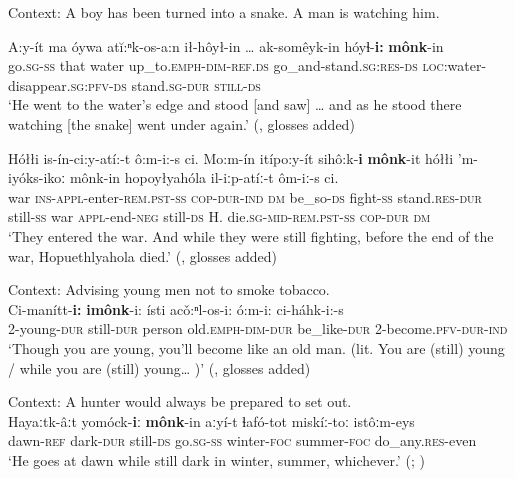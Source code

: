 \begin{exe}
	\ex \label{exAppendixCreekWhile1}
	Context: A boy has been turned into a snake. A man is watching him.
	
\gll A:y-ít ma óywa atĭ:ⁿk-os-a:n ił-hôył-in … ak-somêyk-in hóyɬ-\textbf{i:} \textbf{mônk}-in\\
go.\textsc{sg}-\textsc{ss} that water up\_to.\textsc{emph}-\textsc{dim}-\textsc{ref}.\textsc{ds} go\_and-stand.\textsc{sg}:\textsc{res}-\textsc{ds} {} \textsc{loc}:water-disappear.\textsc{sg}:\textsc{pfv}-\textsc{ds} stand.\textsc{sg}-\textsc{dur} \textsc{still}-\textsc{ds}\\
\glt \lq He went to the water's edge and stood [and saw] … and as he stood there watching [the snake] went under again.\rq{ }(\cite[138]{HaasHill2014}, glosses added)

	\ex \label{exAppendixCreekWhile2}
	\gll Hółłi is-ín-ci:y-atí:-t ô:m-i:-s ci. Mo:m-ín itípo:y-ít sihô:k-\textbf{i} \textbf{mônk}-it hółłi ’m-iyóks-ikoː mônk-in hopoyłyahóla il-iːp-atíː-t ôm-iː-s ci.\\
	war \textsc{ins}-\textsc{appl}-enter-\textsc{rem}.\textsc{pst}-\textsc{ss} \textsc{cop}-\textsc{dur}-\textsc{ind} \textsc{dm} be\_so-\textsc{ds} fight-\textsc{ss} stand.\textsc{res}-\textsc{dur} still-\textsc{ss} war \textsc{appl}-end-\textsc{neg} still-\textsc{ds} H. die.\textsc{sg}-\textsc{mid}-\textsc{rem}.\textsc{pst}-\textsc{ss} \textsc{cop}-\textsc{dur} \textsc{dm}\\
	\glt \lq They entered the war. And while they were still fighting, before the end of the war, Hopuethlyahola died.\rq{ }(\cite[706]{HaasHill2014}, glosses added)
	
	\ex \label{exAppendixCreekWhile3}
	Context: Advising young men not to smoke tobacco.\\
	\gll Ci-manítt-\textbf{i:} \textbf{imônk}-i: ísti acǒ:ⁿl-os-i: ó:m-i: ci-háhk-i:-s\\
	2-young-\textsc{dur}	still-\textsc{dur}	 person old.\textsc{emph}-\textsc{dim}-\textsc{dur}	be\_like-\textsc{dur}	2-become.\textsc{pfv}-\textsc{dur}-\textsc{ind}\\
	\glt \lq Though you are young, you’ll become like an old man. (lit. You are (still) young / while you are (still) young… )\rq{ }(\cite[297]{HaasHill2014}, glosses added)

	\ex \label{exAppendixCreekWhile4}
	Context: A hunter would always be prepared to set out.\\
	\gll Hayaːtk-âːt yomóck-\textbf{iː} \textbf{mônk}-in aːyí-t ɬafó-tot miskíː-toː istôːm-eys\\
	dawn-\textsc{ref} dark-\textsc{dur} still-\textsc{ds} go.\textsc{sg}-\textsc{ss} winter-\textsc{foc} summer-\textsc{foc} do\_any.\textsc{res}-even\\
	\glt \lq He goes at dawn while still dark in winter, summer, whichever.\rq{ }(\cite[321]{Martin2011}; \cite[254]{HaasHill2014})
\end{exe}

